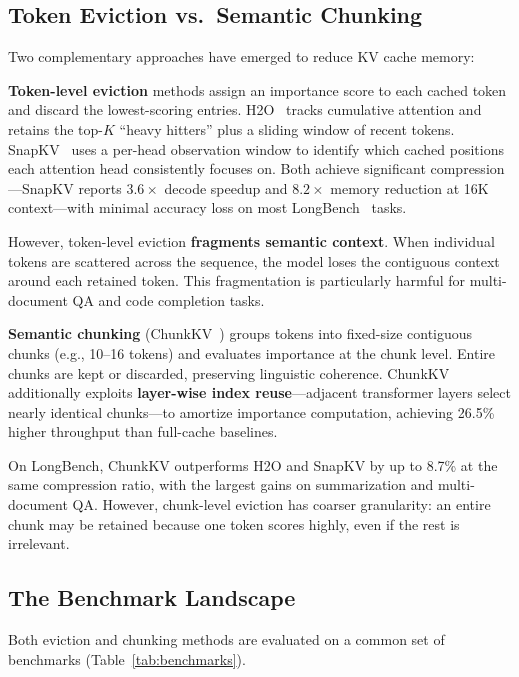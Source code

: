 \documentclass[conference]{IEEEtran}
\begin{document}
\subsection{Token Eviction vs.\ Semantic Chunking}

Two complementary approaches have emerged to reduce KV cache memory:

\textbf{Token-level eviction} methods assign an importance score to each cached token and discard the lowest-scoring entries. H2O~\cite{h2o} tracks cumulative attention and retains the top-$K$ ``heavy hitters'' plus a sliding window of recent tokens. SnapKV~\cite{snapkv} uses a per-head observation window to identify which cached positions each attention head consistently focuses on. Both achieve significant compression---SnapKV reports $3.6\times$ decode speedup and $8.2\times$ memory reduction at 16K context---with minimal accuracy loss on most LongBench~\cite{longbench} tasks.

However, token-level eviction \textbf{fragments semantic context}. When individual tokens are scattered across the sequence, the model loses the contiguous context around each retained token. This fragmentation is particularly harmful for multi-document QA and code completion tasks.

\textbf{Semantic chunking} (ChunkKV~\cite{chunkkv}) groups tokens into fixed-size contiguous chunks (e.g., 10--16 tokens) and evaluates importance at the chunk level. Entire chunks are kept or discarded, preserving linguistic coherence. ChunkKV additionally exploits \textbf{layer-wise index reuse}---adjacent transformer layers select nearly identical chunks---to amortize importance computation, achieving 26.5\% higher throughput than full-cache baselines.

On LongBench, ChunkKV outperforms H2O and SnapKV by up to 8.7\% at the same compression ratio, with the largest gains on summarization and multi-document QA. However, chunk-level eviction has coarser granularity: an entire chunk may be retained because one token scores highly, even if the rest is irrelevant.

\subsection{The Benchmark Landscape}

Both eviction and chunking methods are evaluated on a common set of benchmarks (Table~\ref{tab:benchmarks}).
\end{document}
